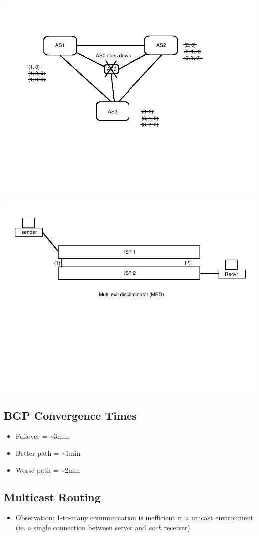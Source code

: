 \documentclass[11pt]{article}
\begin{document}
\includegraphics[width=.9\linewidth]{diagrams/bgp5.png}


\includegraphics[width=.9\linewidth]{diagrams/bgp6.png}

\subsection{BGP Convergence Times}
\label{sec:orgheadline99}
\begin{itemize}
\item Failover = \textasciitilde{}3min
\item Better path = \textasciitilde{}1min
\item Worse path = \textasciitilde{}2min
\end{itemize}

\subsection{Multicast Routing}
\label{sec:orgheadline100}
\begin{itemize}
\item Observation: 1-to-many communication is inefficient in a unicast
environment (ie. a single connection between server and \emph{each}
receiver)
\end{itemize}
\end{document}
